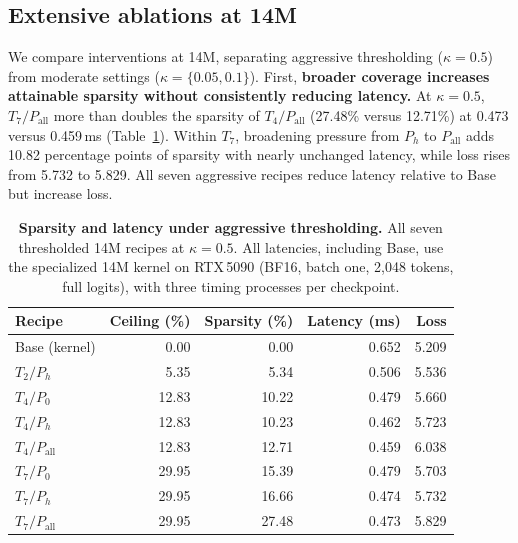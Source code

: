 
\subsection{Extensive ablations at 14M}

We compare interventions at 14M, separating aggressive thresholding ($\kappa=0.5$) from moderate settings ($\kappa=\{0.05,0.1\}$). First, \textbf{broader coverage increases attainable sparsity without consistently reducing latency.} At $\kappa=0.5$, $T_7/P_{\mathrm{all}}$ more than doubles the sparsity of $T_4/P_{\mathrm{all}}$ (27.48\% versus 12.71\%) at 0.473 versus 0.459\,ms (Table~\ref{tab:14m-aggressive}). Within $T_7$, broadening pressure from $P_h$ to $P_{\mathrm{all}}$ adds 10.82 percentage points of sparsity with nearly unchanged latency, while loss rises from 5.732 to 5.829. All seven aggressive recipes reduce latency relative to Base but increase loss.

\begin{table}[!htbp]
\centering\small
\setlength{\tabcolsep}{7pt}
\caption{\textbf{Sparsity and latency under aggressive thresholding.} All seven thresholded 14M recipes at $\kappa=0.5$. All latencies, including Base, use the specialized 14M kernel on RTX\,5090 (BF16, batch one, 2,048 tokens, full logits), with three timing processes per checkpoint.}
\label{tab:14m-aggressive}
\begin{tabular}{@{}lrrrr@{}}
\toprule
Recipe & Ceiling (\%) & Sparsity (\%) & Latency (ms) & Loss \\
\midrule
Base (kernel) & 0.00 & 0.00 & 0.652 & 5.209 \\
\midrule
$T_2/P_h$ & 5.35 & 5.34 & 0.506 & 5.536 \\
\midrule
$T_4/P_0$ & 12.83 & 10.22 & 0.479 & 5.660 \\
$T_4/P_h$ & 12.83 & 10.23 & 0.462 & 5.723 \\
$T_4/P_{\mathrm{all}}$ & 12.83 & 12.71 & 0.459 & 6.038 \\
\midrule
$T_7/P_0$ & 29.95 & 15.39 & 0.479 & 5.703 \\
$T_7/P_h$ & 29.95 & 16.66 & 0.474 & 5.732 \\
$T_7/P_{\mathrm{all}}$ & 29.95 & 27.48 & 0.473 & 5.829 \\
\bottomrule
\end{tabular}
\end{table}

